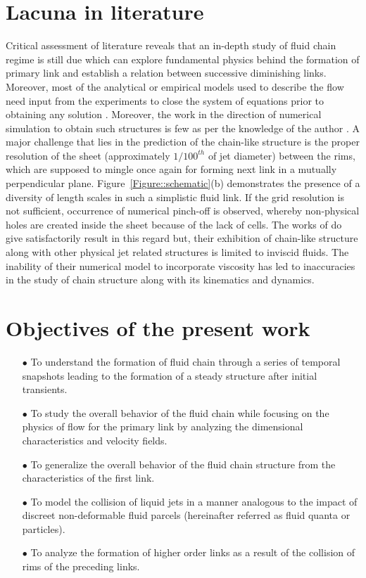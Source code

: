 \section{Lacuna in literature}
Critical assessment of literature reveals that an in-depth study of fluid chain regime is still due which can explore fundamental physics behind the formation of primary link and establish a relation between successive diminishing links. Moreover, most of the analytical or empirical models used to describe the flow need input from the experiments to close the system of equations prior to obtaining any solution \citep{bush2004collision}. Moreover, the work in the direction of numerical simulation to obtain such structures is few as per the knowledge of the author \citep{chen2013high,da2016surface}. A major challenge that lies in the prediction of the chain-like structure is the proper resolution of the sheet (approximately $1/100^{th}$ of jet diameter) between the rims, which are supposed to mingle once again for forming next link in a mutually perpendicular plane. Figure~\ref{Figure::schematic}(b) demonstrates the presence of a diversity of length scales in such a simplistic fluid link. If the grid resolution is not sufficient, occurrence of numerical pinch-off is observed, whereby non-physical holes are created inside the sheet because of the lack of cells. The works of \cite{da2016surface} do give satisfactorily result in this regard but, their exhibition of chain-like structure along with other physical jet related structures is limited to inviscid fluids. The inability of their numerical model to incorporate viscosity has led to inaccuracies in the study of chain structure along with its kinematics and dynamics. 
\section{Objectives of the present work}
\begin{enumerate}
\item [$\bullet$] To understand the formation of fluid chain through a series of temporal snapshots leading to the formation of a steady structure after initial transients.
\item [$\bullet$] To study the overall behavior of the fluid chain while focusing on the physics of flow for the primary link by analyzing the dimensional characteristics and velocity fields.
\item [$\bullet$] To generalize the overall behavior of the fluid chain structure from the characteristics of the first link.
\item [$\bullet$] To model the collision of liquid jets in a manner analogous to the impact of discreet non-deformable fluid parcels (hereinafter referred as fluid quanta or particles). 
\item [$\bullet$] To analyze the formation of higher order links as a result of the collision of rims of the preceding links. 
\end{enumerate}

